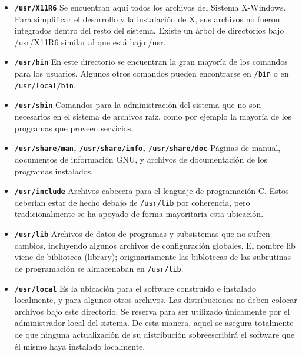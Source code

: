 \documentclass[12pt]{article}
\begin{document}
\begin{itemize} 
	
	\item \textbf{\texttt{/usr/X11R6}}
	 Se encuentran aquí todos los archivos del Sistema
	X-Windows. Para simplificar el desarrollo y la instalación de X,  sus
	archivos no fueron integrados dentro del resto del sistema. Existe un
	árbol de directorios bajo /usr/X11R6 similar al que está bajo /usr.
	


	\item \textbf{\texttt{/usr/bin}}
	 En este directorio se encuentran la gran mayoría de los
	comandos para los usuarios. Algunos otros comandos pueden encontrarse en
	\texttt{/bin} o en 	\texttt{/usr/local/bin}.
	

	\item \textbf{\texttt{/usr/sbin}}
	 Comandos para la administración del sistema que no son
	necesarios en el sistema de archivos raíz, como por ejemplo la mayoría
	de los programas que proveen servicios.  

	\item \textbf{\texttt{/usr/share/man},
	\texttt{/usr/share/info},
	\texttt{/usr/share/doc}}  Páginas
	de manual, documentos de información GNU, y 		archivos de
	documentación de los programas instalados.
	

	\item \textbf{\texttt{/usr/include}}
	 Archivos cabecera para el lenguaje de programación C.
	Estos deberían estar de hecho debajo de \texttt{/usr/lib}
	por coherencia, pero tradicionalmente se ha apoyado de forma mayoritaria
	esta ubicación.  

	\item \textbf{\texttt{/usr/lib}}
	 Archivos de datos de programas y subsistemas que no
	sufren cambios, incluyendo algunos archivos de configuración globales.
	El nombre lib viene de biblioteca (library); originariamente las
	biblotecas de las subrutinas de programación se
	almacenaban en \texttt{/usr/lib}.
	

	\item \textbf{\texttt{/usr/local}}
	 Es la ubicación para el software construído e instalado localmente, y
	para algunos otros archivos.  Las distribuciones no deben colocar
	archivos bajo este directorio. Se 			reserva para ser
	utilizado únicamente por el administrador local del
	sistema. De esta manera, aquel se asegura totalmente de que ninguna
	actualización de su distribución sobreescribirá  el software que él
	mismo haya instalado localmente.


 \end{itemize} 
\end{document}
